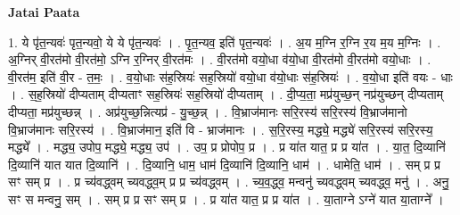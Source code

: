 \documentclass[17pt]{extarticle}
\begin{document}
\textbf{Jatai Paata} \newline

1. ये पृ॑त॒न्यवः॑ पृत॒न्यवो॒ ये ये पृ॑त॒न्यवः॑ । . पृ॒त॒न्यव॒ इति॑ पृत॒न्यवः॑ । . अ॒य म॒ग्नि र॒ग्नि र॒य म॒य म॒ग्निः । . अ॒ग्निर् वी॒रत॑मो वी॒रत॑मो॒ ऽग्नि र॒ग्निर् वी॒रत॑मः । . वी॒रत॑मो वयो॒धा व॑यो॒धा वी॒रत॑मो वी॒रत॑मो वयो॒धाः । . वी॒रत॑म॒ इति॑ वी॒र - त॒मः॒ । . व॒यो॒धाः स॑ह॒स्रियः॑ सह॒स्रियो॑ वयो॒धा व॑यो॒धाः स॑ह॒स्रियः॑ । . व॒यो॒धा इति॑ वयः - धाः । . स॒ह॒स्रियो॑ दीप्यताम् दीप्यताꣳ सह॒स्रियः॑ सह॒स्रियो॑ दीप्यताम् । . दी॒प्य॒ता॒ मप्र॑युच्छ॒न् नप्र॑युच्छन् दीप्यताम् दीप्यता॒ मप्र॑युच्छन्न् । . अप्र॑युच्छ॒न्नित्यप्र॑ - यु॒च्छ॒न्न् । . वि॒भ्राज॑मानः सरि॒रस्य॑ सरि॒रस्य॑ वि॒भ्राज॑मानो वि॒भ्राज॑मानः सरि॒रस्य॑ । . वि॒भ्राज॑मान॒ इति॑ वि - भ्राज॑मानः । . स॒रि॒रस्य॒ मद्ध्ये॒ मद्ध्ये॑ सरि॒रस्य॑ सरि॒रस्य॒ मद्ध्ये᳚ । . मद्ध्य॒ उपोप॒ मद्ध्ये॒ मद्ध्य॒ उप॑ । . उप॒ प्र प्रोपोप॒ प्र । . प्र या॑त यात॒ प्र प्र या॑त । . या॒त॒ दि॒व्यानि॑ दि॒व्यानि॑ यात यात दि॒व्यानि॑ । . दि॒व्यानि॒ धाम॒ धाम॑ दि॒व्यानि॑ दि॒व्यानि॒ धाम॑ । . धामेति॒ धाम॑ । . सम् प्र प्र सꣳ सम् प्र । . प्र च्य॑वद्ध्वम् च्यवद्ध्व॒म् प्र प्र च्य॑वद्ध्वम् । . च्य॒व॒द्ध्व॒ मन्वनु॑ च्यवद्ध्वम् च्यवद्ध्व॒ मनु॑ । . अनु॒ सꣳ स मन्वनु॒ सम् । . सम् प्र प्र सꣳ सम् प्र । . प्र या॑त यात॒ प्र प्र या॑त । . या॒ताग्ने ऽग्ने॑ यात या॒ताग्ने᳚ । \newline
\end{document}

